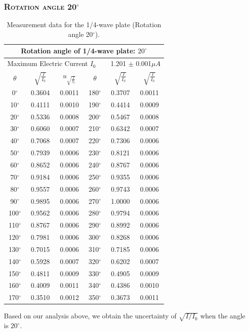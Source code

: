 \documentclass[a4paper,12pt]{article}
\begin{document}
\begin{appendices}
\newpage
\subsubsection{\textsc{Rotation angle 20$^\circ$}}
\begin{table}[h]
\begin{center}
\begin{tabular}{|c|c|c||c|c|c|}
\hline
\multicolumn{6}{|c|}{Rotation angle of 1/4-wave plate: $20^{\circ}$}\\
\hline 
\multicolumn{6}{|c|}{Maximum Electric Current $I_0$ ~~~ 1.201 $\pm$ 0.001$\mu A$}\\
\hline 
$\theta$ & $\sqrt{\frac{I}{I_0}}$ & $u_{\sqrt{\frac{I}{I_0}}}$ & $\theta$ & $\sqrt{\frac{I}{I_0}}$ & $\sqrt{\frac{I}{I_0}}$ \\
\hline
0$^{\circ}$ & 0.3604 & 0.0011 & 180$^{\circ}$ & 0.3707 & 0.0011 \\
\hline 
10$^{\circ}$ & 0.4111 & 0.0010 & 190$^{\circ}$ & 0.4414 & 0.0009\\
\hline
20$^{\circ}$ & 0.5336 & 0.0008 & 200$^{\circ}$ & 0.5467 & 0.0008\\
\hline
30$^{\circ}$ & 0.6060 & 0.0007 & 210$^{\circ}$ & 0.6342 & 0.0007\\
\hline
40$^{\circ}$ & 0.7068 & 0.0007 & 220$^{\circ}$ & 0.7306 & 0.0006\\
\hline
50$^{\circ}$ & 0.7939 & 0.0006 & 230$^{\circ}$ & 0.8121 & 0.0006\\
\hline
60$^{\circ}$ & 0.8652 & 0.0006 & 240$^{\circ}$ & 0.8767 & 0.0006\\
\hline
70$^{\circ}$ & 0.9184 & 0.0006 & 250$^{\circ}$ & 0.9355 & 0.0006\\
\hline
80$^{\circ}$ & 0.9557 & 0.0006 & 260$^{\circ}$ & 0.9743 & 0.0006\\
\hline
90$^{\circ}$ & 0.9895 & 0.0006 & 270$^{\circ}$ & 1.0000 & 0.0006\\
\hline
100$^{\circ}$ & 0.9562 & 0.0006 & 280$^{\circ}$ & 0.9794 & 0.0006\\
\hline
110$^{\circ}$ & 0.8767 & 0.0006 & 290$^{\circ}$ & 0.8992 & 0.0006\\
\hline
120$^{\circ}$ & 0.7981 & 0.0006 & 300$^{\circ}$ & 0.8268 & 0.0006\\
\hline
130$^{\circ}$ & 0.7015 & 0.0006 & 310$^{\circ}$ & 0.7185 & 0.0006\\
\hline
140$^{\circ}$ & 0.5928 & 0.0007 & 320$^{\circ}$ & 0.6202 & 0.0007\\
\hline
150$^{\circ}$ & 0.4811 & 0.0009 & 330$^{\circ}$ & 0.4905 & 0.0009\\
\hline
160$^{\circ}$ & 0.4009 & 0.0011 & 340$^{\circ}$ & 0.4386 & 0.0010\\
\hline
170$^{\circ}$ & 0.3510 & 0.0012 & 350$^{\circ}$ & 0.3673 & 0.0011\\
\hline
\end{tabular}
\caption{Measurement data for the 1/4-wave plate (Rotation angle 20$^{\circ}$).}
\end{center}
\end{table}
Based on our analysis above, we obtain the uncertainty of $\sqrt{I/I_0}$ when the angle is $20^{\circ}$.





\end{appendices}
\end{document}
